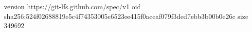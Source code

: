 version https://git-lfs.github.com/spec/v1
oid sha256:524f02688819e5c4f74353005e6523ee415f0aceaf079f3ded7ebb3b00b0e26c
size 349692
